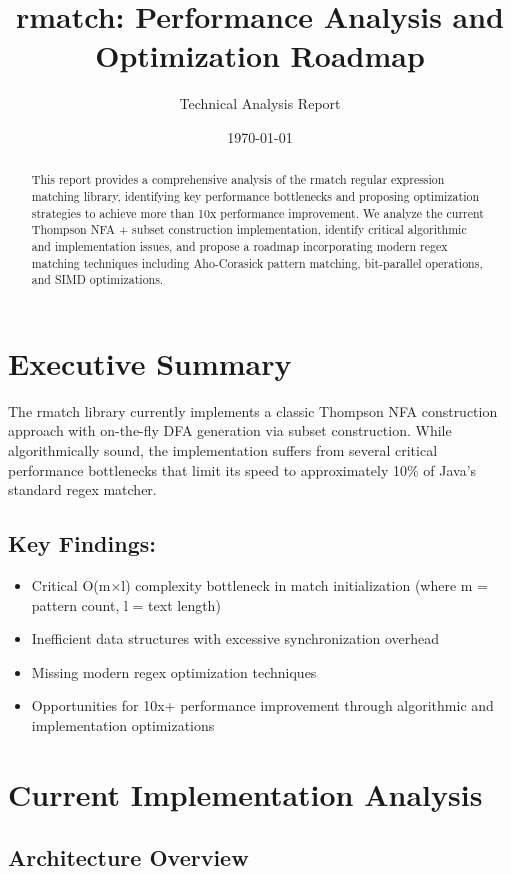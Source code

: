 \documentclass[11pt,a4paper]{article}
\title{rmatch: Performance Analysis and Optimization Roadmap}
\author{Technical Analysis Report}
\date{\today}
\begin{document}
\maketitle

\begin{abstract}
This report provides a comprehensive analysis of the rmatch regular expression matching library, identifying key performance bottlenecks and proposing optimization strategies to achieve more than 10x performance improvement. We analyze the current Thompson NFA + subset construction implementation, identify critical algorithmic and implementation issues, and propose a roadmap incorporating modern regex matching techniques including Aho-Corasick pattern matching, bit-parallel operations, and SIMD optimizations.
\end{abstract}

\section{Executive Summary}

The rmatch library currently implements a classic Thompson NFA construction approach with on-the-fly DFA generation via subset construction. While algorithmically sound, the implementation suffers from several critical performance bottlenecks that limit its speed to approximately 10\% of Java's standard regex matcher.

\subsection{Key Findings:}

\begin{itemize}
\item Critical O(m×l) complexity bottleneck in match initialization (where m = pattern count, l = text length)
\item Inefficient data structures with excessive synchronization overhead
\item Missing modern regex optimization techniques
\item Opportunities for 10x+ performance improvement through algorithmic and implementation optimizations
\end{itemize}

\section{Current Implementation Analysis}

\subsection{Architecture Overview}
\end{document}
